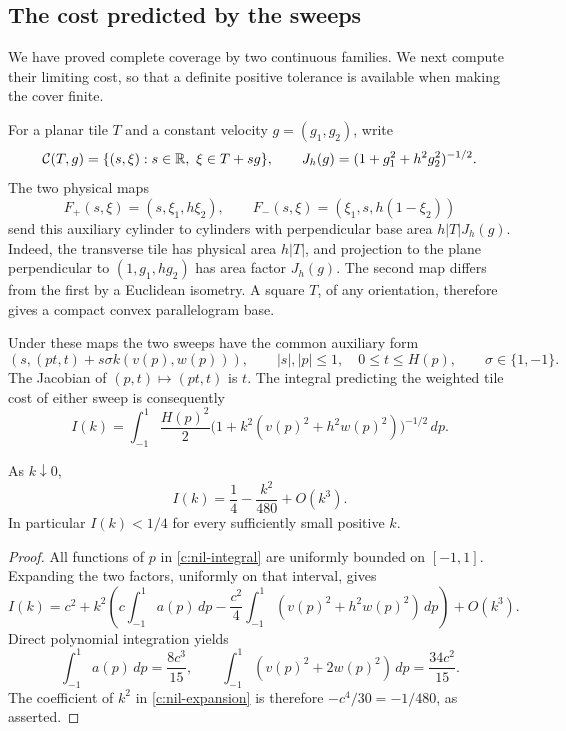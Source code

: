 \subsection{The cost predicted by the sweeps}

We have proved complete coverage by two continuous families.  We next
compute their limiting cost, so that a definite positive tolerance is
available when making the cover finite.

For a planar tile $T$ and a constant velocity $g=(g_1,g_2)$, write
\[
 \mathcal C(T,g)=\{(s,\xi):s\in\R,\ \xi\in T+sg\},
 \qquad J_h(g)=(1+g_1^2+h^2g_2^2)^{-1/2}.
\]
The two physical maps
\begin{equation}\label{c:nil-physical-maps}
 F_+(s,\xi)=(s,\xi_1,h\xi_2),\qquad
 F_-(s,\xi)=(\xi_1,s,h(1-\xi_2))
\end{equation}
send this auxiliary cylinder to cylinders with perpendicular base
area $h|T|J_h(g)$.  Indeed, the transverse tile has physical area
$h|T|$, and projection to the plane perpendicular to
$(1,g_1,hg_2)$ has area factor $J_h(g)$.  The second map differs
from the first by a Euclidean isometry.  A square $T$, of any
orientation, therefore gives a compact convex parallelogram base.

Under these maps the two sweeps have the common auxiliary form
\begin{equation}\label{c:nil-signed-sweep}
 (s,(pt,t)+s\sigma k(v(p),w(p))),\qquad
 |s|,|p|\le1,\quad 0\le t\le H(p),
 \qquad \sigma\in\{1,-1\}.
\end{equation}
The Jacobian of $(p,t)\mapsto(pt,t)$ is $t$.  The integral
predicting the weighted tile cost of either sweep is consequently
\begin{equation}\label{c:nil-integral}
 I(k)=\int_{-1}^1\frac{H(p)^2}{2}
 \bigl(1+k^2(v(p)^2+h^2w(p)^2)\bigr)^{-1/2}\,dp.
\end{equation}

\begin{lemma}\label{c:nil-saving}
As $k\downarrow0$,
\[
 I(k)=\frac14-\frac{k^2}{480}+O(k^3).
\]
In particular $I(k)<1/4$ for every sufficiently small positive $k$.
\end{lemma}

\begin{proof}
All functions of $p$ in \eqref{c:nil-integral} are uniformly bounded
on $[-1,1]$.  Expanding the two factors, uniformly on that interval,
gives
\begin{equation}\label{c:nil-expansion}
 I(k)=c^2+k^2\left(
 c\int_{-1}^1a(p)\,dp-
 \frac{c^2}{4}\int_{-1}^1(v(p)^2+h^2w(p)^2)\,dp
 \right)+O(k^3).
\end{equation}
Direct polynomial integration yields
\[
 \int_{-1}^1a(p)\,dp=\frac{8c^3}{15},\qquad
 \int_{-1}^1(v(p)^2+2w(p)^2)\,dp=\frac{34c^2}{15}.
\]
The coefficient of $k^2$ in \eqref{c:nil-expansion} is therefore
$-c^4/30=-1/480$, as asserted.
\end{proof}

